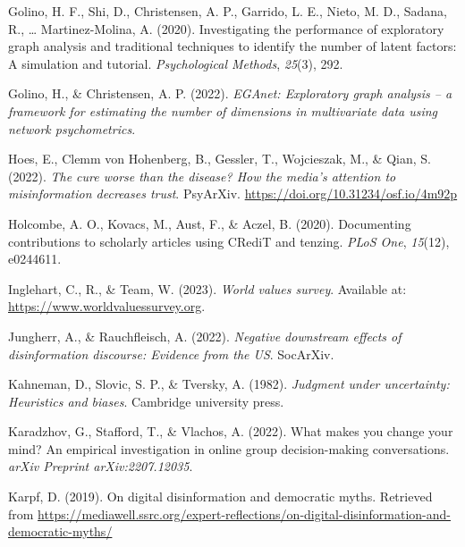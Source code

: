 \documentclass[
  ,jou,floatsintext]{apa6}
\newlength{\cslhangindent}
\newlength{\cslentryspacingunit} %
\newenvironment{CSLReferences}[2] %
 {%
  \setlength{\parindent}{0pt}
  \ifodd #1
  \let\oldpar\par
  \def\par{\hangindent=\cslhangindent\oldpar}
  \fi
  \setlength{\parskip}{#2\cslentryspacingunit}
 }%
 {}
\begin{document}
\begin{CSLReferences}{1}{0}
\leavevmode{}%
Golino, H. F., Shi, D., Christensen, A. P., Garrido, L. E., Nieto, M. D., Sadana, R., \ldots{} Martinez-Molina, A. (2020). Investigating the performance of exploratory graph analysis and traditional techniques to identify the number of latent factors: A simulation and tutorial. \emph{Psychological Methods}, \emph{25}(3), 292.

\leavevmode{}%
Golino, H., \& Christensen, A. P. (2022). \emph{EGAnet: Exploratory graph analysis -- a framework for estimating the number of dimensions in multivariate data using network psychometrics}.

\leavevmode{}%
Hoes, E., Clemm von Hohenberg, B., Gessler, T., Wojcieszak, M., \& Qian, S. (2022). \emph{The cure worse than the disease? How the media's attention to misinformation decreases trust}. PsyArXiv. \url{https://doi.org/10.31234/osf.io/4m92p}

\leavevmode{}%
Holcombe, A. O., Kovacs, M., Aust, F., \& Aczel, B. (2020). Documenting contributions to scholarly articles using CRediT and tenzing. \emph{PLoS One}, \emph{15}(12), e0244611.

\leavevmode{}%
Inglehart, C., R., \& Team, W. (2023). \emph{World values survey}. Available at: \url{https://www.worldvaluessurvey.org}.

\leavevmode{}%
Jungherr, A., \& Rauchfleisch, A. (2022). \emph{Negative downstream effects of disinformation discourse: Evidence from the US}. SocArXiv.

\leavevmode{}%
Kahneman, D., Slovic, S. P., \& Tversky, A. (1982). \emph{Judgment under uncertainty: Heuristics and biases}. Cambridge university press.

\leavevmode{}%
Karadzhov, G., Stafford, T., \& Vlachos, A. (2022). What makes you change your mind? An empirical investigation in online group decision-making conversations. \emph{arXiv Preprint arXiv:2207.12035}.

\leavevmode{}%
Karpf, D. (2019). On digital disinformation and democratic myths. Retrieved from \url{https://mediawell.ssrc.org/expert-reflections/on-digital-disinformation-and-democratic-myths/}


\end{CSLReferences}
\end{document}
